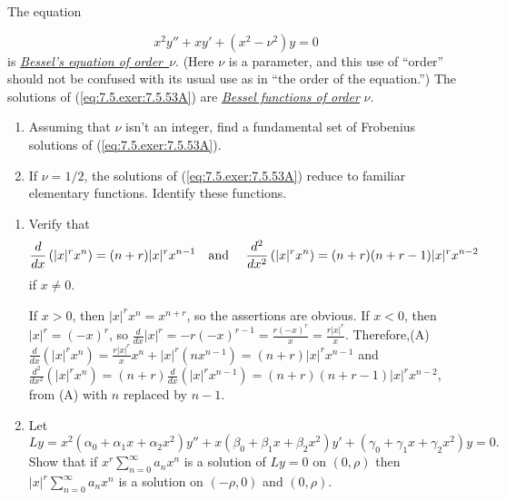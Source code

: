 \documentclass{ximera}
\begin{document}
\begin{problem}\label{exer:7.5.53}
The equation

\begin{equation} \label{eq:7.5.exer:7.5.53A}
 x^2y''+xy'+(x^2-\nu^2)y=0
\end{equation}
is
\href{http://www-history.mcs.st-and.ac.uk/Mathematicians/Bessel.html}
 {\color{blue}\it Bessel's equation of order~$\nu$\/}.
(Here $\nu$ is a parameter, and this use of ``order'' should not be
confused with its usual use as in ``the order of the equation.'') The
solutions of (\ref{eq:7.5.exer:7.5.53A}) are
\href{http://www-history.mcs.st-and.ac.uk/Mathematicians/Bessel.html}
{\color{blue}\it Bessel
functions of order\/} $\nu$.
\begin{enumerate}
\item %
Assuming that $\nu$ isn't
an integer, find a fundamental set of Frobenius solutions of
(\ref{eq:7.5.exer:7.5.53A}).
\item %
 If $\nu=1/2$, the solutions of
(\ref{eq:7.5.exer:7.5.53A}) reduce to familiar elementary functions. Identify these
functions.
\end{enumerate}
\end{problem}

\begin{problem}\label{exer:7.5.54}
\begin{enumerate}
\item %
Verify that
$$
\frac{d}{dx}\left(|x|^rx^n\right)=(n+r)|x|^rx^{n-1}\mbox{\quad and \quad}
\frac{d^2}{dx^2}\left(|x|^rx^n\right)=(n+r)(n+r-1)|x|^rx^{n-2}
$$
if $x\neq 0$.

\begin{solution}
    If $x>0$, then $|x|^rx^n=x^{n+r}$, so the assertions
are obvious. If $x<0$, then $|x|^r=(-x)^r$, so
$\frac{d}{ dx}|x|^r=-r(-x)^{r-1}=\frac{r(-x)^r}{ x}=\frac{r|x|^r}{ x}$.
Therefore,(A) $\frac{d}{ dx}(|x|^rx^n)=\frac{r|x|^r}{
x}x^n+|x|^r(nx^{n-1})=(n+r)|x|^rx^{n-1}$ and
$\frac{d^2}{ dx^2}(|x|^rx^n)=(n+r)\frac{d}{ dx}(|x|^rx^{n-1})=
(n+r)(n+r-1)|x|^rx^{n-2}$, from (A) with $n$ replaced by $n-1$.
\end{solution}

\item %
Let
$$
Ly=
x^2(\alpha_0+\alpha_1x+\alpha_2x^2)y''+x(\beta_0+\beta_1x+\beta_2x^2)y'
+(\gamma_0+\gamma_1x+\gamma_2x^2)y=0.
$$
 Show   that if $x^r\sum_{n=0}^\infty a_nx^n$ is a solution of
$Ly=0$ on
$(0,\rho)$ then  $|x|^r\sum_{n=0}^\infty a_nx^n$ is a solution on
$(-\rho,0)$ and $(0,\rho)$.
\end{enumerate}
\end{problem}
\end{document}
